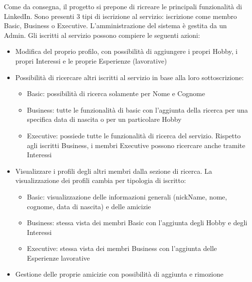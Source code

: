 Come da consegna, il progetto si prepone di ricreare le principali
funzionalit\`a di LinkedIn. Sono presenti 3 tipi di iscrizione al servizio:
iscrizione come membro Basic, Business o Executive. L'amministrazione del
sistema \`e gestita da un Admin. Gli iscritti al servizio possono compiere
le seguenti azioni:
\begin{itemize}

\item Modifica del proprio profilo, con possibilit\`a di aggiungere
  i propri Hobby, i propri Interessi e le proprie Esperienze (lavorative)

\item Possibilit\`a di ricercare altri iscritti al servizio in base alla
  loro sottoscrizione:
  \begin{itemize}
    
  \item Basic: possibilit\`a di ricerca solamente per Nome e Cognome
  \item Business: tutte le funzionalit\`a di basic con l'aggiunta
    della ricerca per una specifica data di nascita o per un particolare
    Hobby
  \item Executive: possiede tutte le funzionalit\`a di ricerca del
    servizio. Rispetto agli iscritti Business, i membri Executive possono
    ricercare anche tramite Interessi

  \end{itemize}

\item Visualizzare i profili degli altri membri dalla sezione di ricerca.
  La visualizzazione dei profili cambia per tipologia di iscritto:
  \begin{itemize}

  \item Basic: visualizzazione delle informazioni generali (nickName,
    nome, cognome, data di nascita) e delle amicizie
  \item Business: stessa vista dei membri Basic con l'aggiunta
    degli Hobby e degli Interessi
  \item Executive: stessa vista dei membri Business con l'aggiunta
    delle Esperienze lavorative

  \end{itemize}

\item Gestione delle proprie amicizie con possibilit\`a di aggiunta e
  rimozione
  
\end{itemize}

